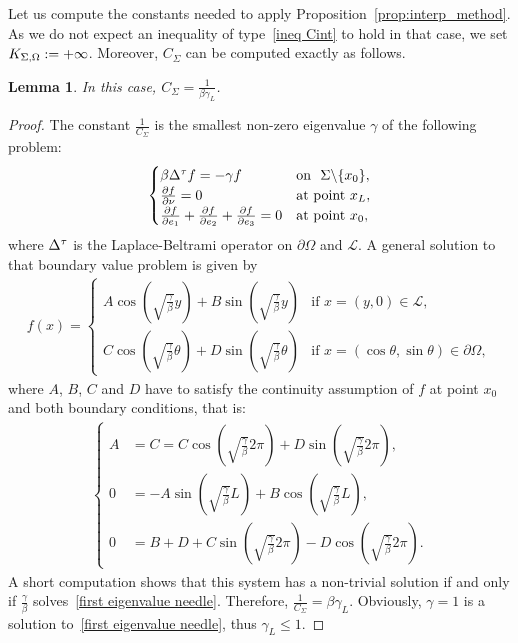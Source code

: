 \documentclass[a4paper]{article}
\newtheorem{lemma}[theorem]{Lemma}
\theoremstyle{definition}
\numberwithin{equation}{section}
\begin{document}
Let us compute the constants needed to apply Proposition~\ref{prop:interp_method}. 
As we do not expect an inequality of type~\eqref{ineq Cint} to hold in that case, we set $K_{\Sigma,\Omega}:=+\infty$. Moreover, $C_\Sigma$ can be computed exactly as follows.

\begin{lemma}
In this case, $C_\Sigma=\frac{1}{\beta \gamma_L}$.
\end{lemma}

\begin{proof}
The constant $\frac{1}{C_\Sigma}$ is the smallest non-zero eigenvalue $\gamma$ of the  following problem:
\begin{align*}
  \begin{cases}
   \beta \Delta^\tau f = -\gamma f & \mbox{on}\ \ \Sigma \backslash\{x_0\},\\
    \frac{\partial f}{\partial \nu} = 0 & \mbox{at point }x_L,\\
    \frac{\partial f}{\partial e_1}+\frac{\partial f}{\partial e_2}+\frac{\partial f}{\partial e_3}= 0 & \mbox{at point }x_0,
  \end{cases}
\end{align*}
where $\Delta^\tau$ is the Laplace-Beltrami operator on $\partial \Omega $ and $\mathcal L$.
A general solution to that boundary value problem is given by
\begin{align*}
f(x)=\begin{cases}
 A \cos (\sqrt{\frac{\gamma}{\beta}}y)+B \sin (\sqrt{\frac{\gamma}{\beta}}y)  & \mbox{if } x=(y,0) \in \mathcal L, \\
C \cos (\sqrt{\frac{\gamma}{\beta}}\theta) + D \sin(\sqrt{\frac{\gamma}{\beta}}\theta)  & \mbox{if } x=(\cos \theta, \sin \theta) \in \partial \Omega,
\end{cases}
\end{align*}
where $A$, $B$, $C$ and $D$ have to satisfy the continuity assumption of $f$ at point $x_0$ and  both boundary conditions, that is:
\begin{align*}
\left\{ \begin{aligned}
A &= C = C \cos (\sqrt{\frac{\gamma}{\beta}} 2 \pi) + D \sin(\sqrt{\frac{\gamma}{\beta}}2 \pi) ,\\
0 &= -A \sin  (\sqrt{\frac{\gamma}{\beta}}L) + B \cos (\sqrt{\frac{\gamma}{\beta}}L), \\
0 &= B + D + C \sin (\sqrt{\frac{\gamma}{\beta}}2 \pi) - D \cos (\sqrt{\frac{\gamma}{\beta}}2 \pi).
\end{aligned}
\right.
\end{align*}
A short computation shows that this system has a non-trivial solution if and only if $\frac{\gamma}{\beta}$ solves~\eqref{first eigenvalue needle}. Therefore, $\frac{1}{C_\Sigma}=\beta \gamma_L$. Obviously, $\gamma=1$ is a solution to~\eqref{first eigenvalue needle}, thus $\gamma_L \leq 1$. 
 \end{proof}
\end{document}
